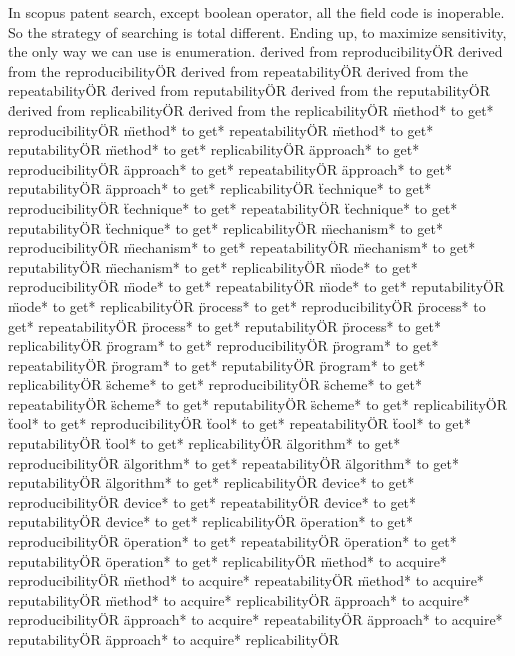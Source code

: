 \documentclass[
10pt, %
a4paper, %
oneside, %
headinclude,footinclude, %
BCOR5mm, %
]{scrartcl}
\begin{document}
In scopus patent search, except boolean operator, all the field code is inoperable. So the strategy of searching is total different. Ending up, to maximize sensitivity, the only way we can use is enumeration.
\"derived from reproducibility\" OR \"derived from the reproducibility\" OR \"derived from repeatability\" OR \"derived from the repeatability\" OR \"derived from reputability\" OR \"derived from the reputability\" OR \"derived from replicability\" OR \"derived from the replicability\" OR 
\"method* to get* reproducibility\" OR \"method* to get* repeatability\" OR \"method* to get* reputability\" OR \"method* to get* replicability\" OR 
\"approach* to get* reproducibility\" OR \"approach* to get* repeatability\" OR \"approach* to get* reputability\" OR \"approach* to get* replicability\" OR 
\"technique* to get* reproducibility\" OR \"technique* to get* repeatability\" OR \"technique* to get* reputability\" OR \"technique* to get* replicability\" OR 
\"mechanism* to get* reproducibility\" OR \"mechanism* to get* repeatability\" OR \"mechanism* to get* reputability\" OR \"mechanism* to get* replicability\" OR 
\"mode* to get* reproducibility\" OR \"mode* to get* repeatability\" OR \"mode* to get* reputability\" OR \"mode* to get* replicability\" OR 
\"process* to get* reproducibility\" OR \"process* to get* repeatability\" OR \"process* to get* reputability\" OR \"process* to get* replicability\" OR 
\"program* to get* reproducibility\" OR \"program* to get* repeatability\" OR \"program* to get* reputability\" OR \"program* to get* replicability\" OR 
\"scheme* to get* reproducibility\" OR \"scheme* to get* repeatability\" OR \"scheme* to get* reputability\" OR \"scheme* to get* replicability\" OR 
\"tool* to get* reproducibility\" OR \"tool* to get* repeatability\" OR \"tool* to get* reputability\" OR \"tool* to get* replicability\" OR 
\"algorithm* to get* reproducibility\" OR \"algorithm* to get* repeatability\" OR \"algorithm* to get* reputability\" OR \"algorithm* to get* replicability\" OR 
\"device* to get* reproducibility\" OR \"device* to get* repeatability\" OR \"device* to get* reputability\" OR \"device* to get* replicability\" OR 
\"operation* to get* reproducibility\" OR \"operation* to get* repeatability\" OR \"operation* to get* reputability\" OR \"operation* to get* replicability\" OR 
\"method* to acquire* reproducibility\" OR \"method* to acquire* repeatability\" OR \"method* to acquire* reputability\" OR \"method* to acquire* replicability\" OR 
\"approach* to acquire* reproducibility\" OR \"approach* to acquire* repeatability\" OR \"approach* to acquire* reputability\" OR \"approach* to acquire* replicability\" OR 
\end{document}

